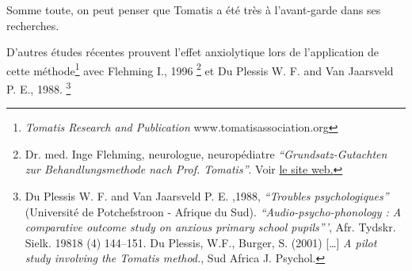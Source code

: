Somme toute, on peut penser que Tomatis a été très à l'avant-garde
dans ses recherches.

D'autres études récentes prouvent l'effet anxiolytique lors de
l'application de cette
méthode\footnote{\emph{Tomatis Research and Publication} www.tomatisassociation.org}  avec Flehming
I., 1996 \footnote{Dr. med. Inge Flehming,
	neurologue, neuropédiatre \emph{``Grundsatz-Gutachten zur Behandlungsmethode
		nach Prof. Tomatis''}. Voir
\href{http://www.analytische-hoertherapie.de/uploads/tx\_templavoila/Grundsatzgu
tachten\_zur\_Behandlungsmethode\_nach\_Prof.\_Tomatis.pdf}{le site
web.}} et Du Plessis W. F. and Van Jaarsveld P. E., 1988.
 \footnote{Du Plessis W. F. and Van Jaarsveld P. E. ,1988, \textit{``Troubles
psychologiques''} (Université de Potchefstroon
- Afrique du Sud).
	\textit{``Audio-psycho-phonology : A comparative outcome study on anxious
primary school pupils'''},  Afr. Tydskr. Sielk. 19818 (4) 144--151. Du Plessis, W.F., Burger, S. (2001) [\ldots]
	\emph{A pilot study involving the Tomatis method.}, Sud Africa J.
Psychol.}
